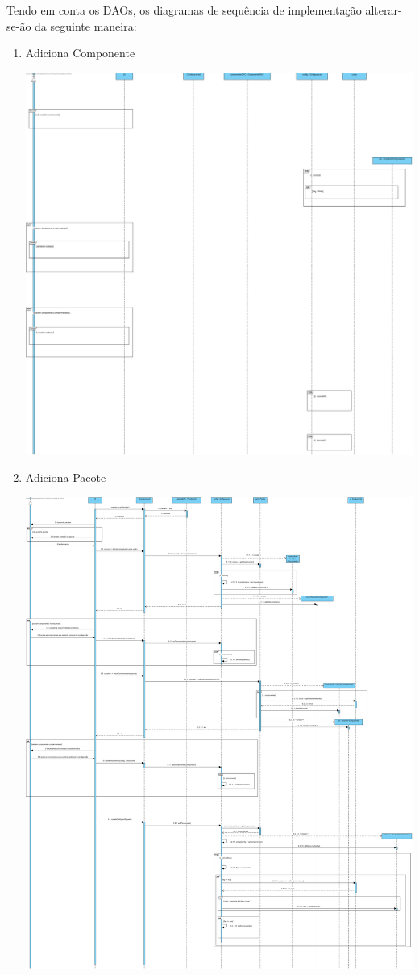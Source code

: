 \documentclass[11pt]{article} %
\begin{document}
Tendo em conta os DAOs, os diagramas de sequência de implementação alterar-se-ão da seguinte maneira:
\begin{enumerate}
	\item Adiciona Componente
		\begin{center}
 			\includegraphics[width = 6in]{dsi2_adicionar_componente.png}
		\end{center}
	\item Adiciona Pacote
		\begin{center}
 			\includegraphics[width = 6in]{dsi2_adicionar_pacote.png}

\end{center}
\end{enumerate}
\end{document}
